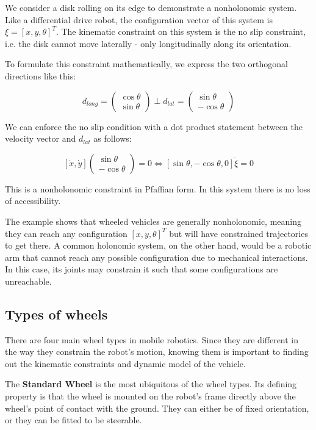 \documentclass[twoside]{article}
\begin{document}
We consider a disk rolling on its edge to demonstrate a nonholonomic system. Like a differential drive robot, the configuration vector of this system is $ \xi = [x, y, \theta]^T $. The kinematic constraint on this system is the no slip constraint, i.e. the disk cannot move laterally - only longitudinally along its orientation.

To formulate this constraint mathematically, we express the two orthogonal directions like this:

\[ d_{long} =
\begin{pmatrix} \cos \theta \\ \sin \theta \end{pmatrix}
\perp
d_{lat} =
\begin{pmatrix} \sin \theta \\ -\cos \theta \end{pmatrix}
\]

We can enforce the no slip condition with a dot product statement between the velocity vector and $ d_{lat} $ as follows:

$$
[\dot{x},  \dot{y}] \begin{pmatrix} \sin \theta \\ -\cos \theta \end{pmatrix} = 0 \iff
[\sin \theta, -\cos \theta, 0] \dot{\xi} = 0
$$

This is a nonholonomic constraint in Pfaffian form. In this system there is no loss of accessibility.

The example shows that wheeled vehicles are generally nonholonomic, meaning they can reach any configuration $[x,y,\theta]^T$ but will have constrained trajectories to get there. A common holonomic system, on the other hand, would be a robotic arm that cannot reach any possible configuration due to mechanical interactions. In this case, its joints may constrain it such that some configurations are unreachable.

\subsection*{Types of wheels}

There are four main wheel types in mobile robotics. Since they are different in the way they constrain the robot's motion, knowing them is important to finding out the kinematic constraints and dynamic model of the vehicle.

The \textbf{Standard Wheel} is the most ubiquitous of the wheel types. Its defining property is that the wheel is mounted on the robot's frame directly above the wheel's point of contact with the ground. They can either be of fixed orientation, or they can be fitted to be steerable\cite{sns}.
\end{document}
